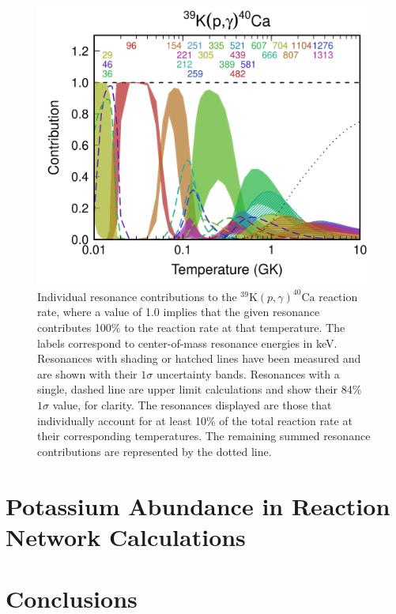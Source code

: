 \begin{figure}[t]
\includegraphics[width=6.5in]{Chapter-6/figs/Contrib_Fox.png} %
\caption{\label{fig:contrib}Individual resonance contributions to the $^{39}\mathrm{K}(p,\gamma)^{40}\mathrm{Ca}$ reaction rate, where a value of 1.0 implies that the given resonance contributes 100$\%$ to the reaction rate at that temperature. The labels correspond to center-of-mass resonance energies in keV. Resonances with shading or hatched lines have been measured and are shown with their $1\sigma$ uncertainty bands. Resonances with a single, dashed line are upper limit calculations and show their 84$\%$ $1\sigma$ value, for clarity. The resonances displayed are those that individually account for at least 10$\%$ of the total reaction rate at their corresponding temperatures. The remaining summed resonance contributions are represented by the dotted line.}
\end{figure}

\section{Potassium Abundance in Reaction Network Calculations}


\section{Conclusions}


